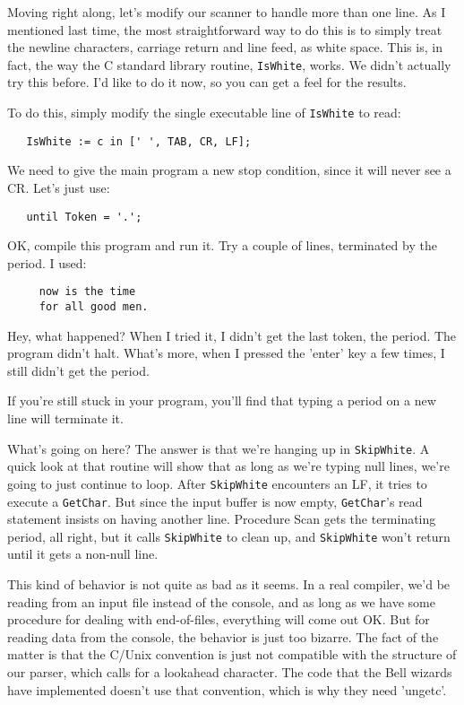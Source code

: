 Moving right along, let's modify  our scanner to handle more than one line. As I mentioned last time, the most straightforward way to  do  this  is to simply treat the newline characters, carriage return  and line feed, as white space. This is, in fact, the way the  C  standard  library  routine, {\tt IsWhite}, works. We  didn't actually try this  before. I'd like to do it now, so you can get a feel for the results.

To do this, simply modify the single executable  line  of {\tt IsWhite} to read:

\begin{verbatim}
   IsWhite := c in [' ', TAB, CR, LF];
\end{verbatim}

We need to give the main  program  a new stop condition, since it will never see a CR. Let's just use:

\begin{verbatim}
   until Token = '.';
\end{verbatim}

OK, compile this  program  and  run  it. Try a couple of lines, terminated by the period. I used:

\begin{verbatim}
     now is the time
     for all good men.
\end{verbatim}

Hey, what  happened?   When I tried it, I didn't  get  the  last token, the period. The program didn't halt. What's more, when I pressed the  'enter'  key  a  few  times, I still didn't get the period.

If you're still stuck in your program, you'll find that  typing a period on a new line will terminate it.

What's going on here?  The answer is  that  we're  hanging  up in {\tt SkipWhite}. A quick look at  that  routine will show that as long as we're typing null lines, we're going to just continue to loop. After {\tt SkipWhite} encounters an LF, it tries to execute a {\tt GetChar}. But since the input buffer is now empty, {\tt GetChar}'s read statement insists  on  having  another  line. Procedure  Scan  gets  the terminating period, all right, but  it  calls {\tt SkipWhite} to clean up, and {\tt SkipWhite} won't return until it gets a non-null line.

This kind of behavior is not quite as bad as it seems. In a real compiler, we'd  be  reading  from  an input file instead of  the console, and as long  as  we have some procedure for dealing with end-of-files, everything will come out  OK. But for reading data from the console, the behavior is just too bizarre. The  fact of the matter is that the C/Unix convention is  just  not compatible with the structure of  our  parser, which  calls for a lookahead character. The  code that the Bell  wizards  have  implemented doesn't use that convention, which is why they need 'ungetc'.

